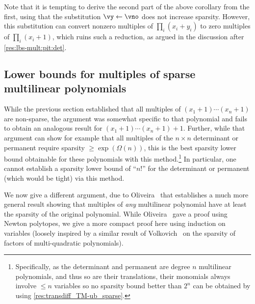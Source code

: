 \documentclass{toc}
\begin{document}
Note that it is tempting to derive the second part of the above corollary from the first, using that the substitution $\vy\leftarrow\vno$ does not increase sparsity.  However, this substitution can convert nonzero multiples of $\prod_i (x_i+y_i)$ to zero multiples of $\prod_i (x_i+1)$, which ruins such a reduction, as argued in the discussion after \autoref{res:lbs-mult:pit:det}.

\subsection{Lower bounds for multiples of sparse multilinear polynomials}

While the previous section established that all multiples of $(x_1+1)\cdots (x_n+1)$ are non-sparse, the argument was somewhat specific to that polynomial and fails to obtain an analogous result for $(x_1+1)\cdots (x_n+1)+1$.  Further, while that argument can show for example that all multiples of the $n\times n$ determinant or permanent require sparsity $\ge \exp(\Omega(n))$, this is the best sparsity lower bound obtainable for these polynomials with this method.\footnote{Specifically, as the determinant and permanent are degree $n$ multilinear polynomials, and thus so are their translations, their monomials always involve $\le n$ variables so no sparsity bound better than $2^n$ can be obtained by using \autoref{res:transdiff_TM-ub_sparse}.} In particular, one cannot establish a sparsity lower bound of ``$n!$'' for the determinant or permanent (which would be tight) via this method.

We now give a different argument, due to Oliveira~\cite{Oliveira15b} that establishes a much more general result showing that multiples of \emph{any} multilinear polynomial have at least the sparsity of the original polynomial.  While Oliveira~\cite{Oliveira15b} gave a proof using Newton polytopes, we give a more compact proof here using induction on variables (loosely inspired by a similar result of Volkovich~\cite{Volkovich15b} on the sparsity of factors of multi-quadratic polynomials).
\end{document}
